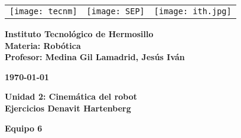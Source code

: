 \begin{titlepage}
	\centering
	\begin{tabular}{@{}p{} p{} p{}@{}}
		\texttt{[image: tecnm]} & 
		\centering \texttt{[image: SEP]} & 
		\raggedleft \texttt{[image: ith.jpg]} \\
	\end{tabular}
	
	\vspace{2em}
	
	\noindent
	\begin{minipage}[t]{0.48\textwidth}
		\raggedright
		\small \textbf{%
			Instituto Tecnológico de Hermosillo\\
			Materia: Robótica\\
			Profesor: Medina Gil Lamadrid, Jesús Iván%
		}
	\end{minipage}%
	\hfill
	\begin{minipage}[t]{0.48\textwidth}
		\raggedleft
		\small \textbf{\today}
	\end{minipage}
	
	\vspace{2em}
	
	{\large \textbf{Unidad 2: Cinemática del robot}}\\
	{\Huge \textbf{Ejercicios Denavit Hartenberg}}
		
	\vspace{1em}
	
	\begin{center}
		{\Large \textbf{Equipo 6}}
	\end{center}
	
	\vspace{1em}
	

\end{titlepage}
